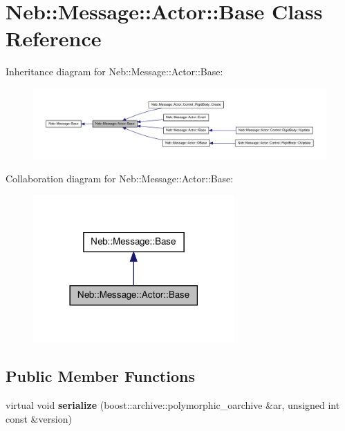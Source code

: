 \hypertarget{classNeb_1_1Message_1_1Actor_1_1Base}{\section{\-Neb\-:\-:\-Message\-:\-:\-Actor\-:\-:\-Base \-Class \-Reference}
\label{classNeb_1_1Message_1_1Actor_1_1Base}
}


\-Inheritance diagram for \-Neb\-:\-:\-Message\-:\-:\-Actor\-:\-:\-Base\-:\nopagebreak
\begin{figure}[H]
\begin{center}
\leavevmode
\includegraphics[width=350pt]{classNeb_1_1Message_1_1Actor_1_1Base__inherit__graph}
\end{center}
\end{figure}


\-Collaboration diagram for \-Neb\-:\-:\-Message\-:\-:\-Actor\-:\-:\-Base\-:\nopagebreak
\begin{figure}[H]
\begin{center}
\leavevmode
\includegraphics[width=218pt]{classNeb_1_1Message_1_1Actor_1_1Base__coll__graph}
\end{center}
\end{figure}
\subsection*{\-Public \-Member \-Functions}
\begin{DoxyCompactItemize}
\item 
\hypertarget{classNeb_1_1Message_1_1Actor_1_1Base_a79d66ba38da0f5fc15e2c6f1b2a2166c}{virtual void {\bfseries serialize} (boost\-::archive\-::polymorphic\-\_\-oarchive \&ar, unsigned int const \&version)}\label{classNeb_1_1Message_1_1Actor_1_1Base_a79d66ba38da0f5fc15e2c6f1b2a2166c}

\end{DoxyCompactItemize}
